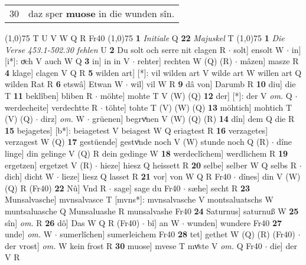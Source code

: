 \documentclass[8pt,a4paper,notitlepage]{article}
\begin{document}
\begin{table}[ht]
\begin{minipage}[t]{0.5\linewidth}
\begin{tabular}{rl}
30 & daz sper \textbf{muose} in die wunden sîn.\\ 
\end{tabular}
\scriptsize
\line(1,0){75} \newline
T U V W Q R Fr40 \newline
\line(1,0){75} \newline
\textbf{1} \textit{Initiale} Q  \textbf{22} \textit{Majuskel} T  \newline
\line(1,0){75} \newline
\textbf{1} \textit{Die Verse 453.1-502.30 fehlen} U  \textbf{2} Du solt och serre nit clagen R  $\cdot$ solt] ensolt W  $\cdot$ in] [i*]: oͮch V auch W Q \textbf{3} in] in in V  $\cdot$ rehter] rechten W (Q) (R)  $\cdot$ mâzen] masze R \textbf{4} klage] clagen V Q R \textbf{5} wilden art] [*]: vil wilden art V wilde art W willen art Q wilden Rat R \textbf{6} etswâ] Etwan W  $\cdot$ wil] vil W R \textbf{9} dâ von] Darumb R \textbf{10} diu] die T \textbf{11} beklîben] bliben R  $\cdot$ möhte] mohte T V (W) (Q) \textbf{12} der] [*]: der V \textit{om.} Q  $\cdot$ werdecheite] verdechtte R  $\cdot$ töhte] tohte T (V) (W) (Q) \textbf{13} möhtich] mohtich T (V) (Q)  $\cdot$ dirz] \textit{om.} W  $\cdot$ grüenen] begrvͤnen V (W) (Q) (R) \textbf{14} dîn] dem Q die R \textbf{15} bejagetes] [b*]: beiagetest V beiagest W Q eriagtest R \textbf{16} verzagetes] verzagest W (Q) \textbf{17} gestüende] gestvͤnde noch V (W) stunde noch Q (R)  $\cdot$ dîne linge] din gelinge V (Q) R dein gedinge W \textbf{18} werdeclîchem] werdlichem R \textbf{19} ergetzen] ergetzet V (R)  $\cdot$ hieze] hiesz Q heissett R \textbf{20} selbe] selber W Q selbs R  $\cdot$ dich] dicht W  $\cdot$ lieze] liesz Q lasset R \textbf{21} vor] von W Q R Fr40  $\cdot$ dînes] din V (W) (Q) R (Fr40) \textbf{22} Nû] Vnd R  $\cdot$ sage] sage du Fr40  $\cdot$ sæhe] secht R \textbf{23} Munsalvasche] mvnsalvasce T [mvns*]: mvnsalvasche V montsaluatschs W muntsaluasche Q Munsaluashe R munsalvashe Fr40 \textbf{24} Saturnus] saturnuß W \textbf{25} sîn] \textit{om.} R \textbf{26} dô] Das W Q R (Fr40)  $\cdot$ bî] an W  $\cdot$ wunden] wundere Fr40 \textbf{27} unde] \textit{om.} W  $\cdot$ sumerlîchen] sumerleichem Fr40 \textbf{28} tet] gethet W (Q) (R) (Fr40)  $\cdot$ der vrost] \textit{om.} W kein frost R \textbf{30} muose] mvese T mvͤste V \textit{om.} Q Fr40  $\cdot$ die] der V R \newline
\end{minipage}
\end{table}
\end{document}
